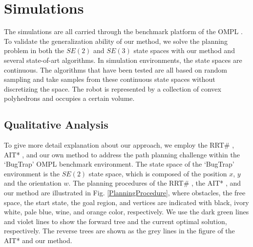 \section{Simulations}



The simulations are all carried through the benchmark platform of the OMPL \cite{sucan2012open} \cite{moll2015benchmarking}.
To validate the generalization ability of our method, we solve the planning problem in both the $SE(2)$ and $SE(3)$ state spaces with our method and several state-of-art algorithms.
In simulation environments, the state spaces are continuous. 
The algorithms that have been tested are all based on random sampling and take samples from these continuous state spaces without discretizing the space.
The robot is represented by a collection of convex polyhedrons and occupies a certain volume.


\subsection{Qualitative Analysis}



To give more detail explanation about our approach, we employ the RRT\# \cite{arslan2013use}, AIT* \cite{strub2020adaptively}, and our own method to address the path planning challenge within the `BugTrap' OMPL benchmark environment.
The state space of the `BugTrap' environment is the $SE(2)$ state space, which is composed of the position $x$, $y$ and the orientation $w$.
The planning procedures of the RRT\# \cite{arslan2013use}, the AIT* \cite{strub2020adaptively}, and our method are illustrated in Fig. \ref{PlanningProcedure}, where obstacles, the free space, the start state, the goal region, and vertices are indicated with black, ivory white, pale blue, wine, and orange color, respectively.
We use the dark green lines and violet lines to show the forward tree and the current optimal solution, respectively.
The reverse trees are shown as the grey lines in the figure of the AIT* \cite{strub2020adaptively} and our method.


